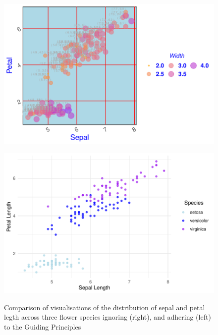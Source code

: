\documentclass{article}\usepackage[]{graphicx}\usepackage[]{xcolor}
\newenvironment{knitrout}{}{} %
\begin{document}
\begin{figure}[htbp]
  \centering
  \begin{minipage}[b]{0.45\linewidth}
\begin{knitrout}\scriptsize
{}\color{fgcolor}

{\centering \includegraphics[width=\linewidth]{figure/beamer-messygraph-1} 

}


\end{knitrout}
    \label{fig:messygraph}
  \end{minipage}
  \hfill
  \begin{minipage}[b]{0.45\linewidth}
\begin{knitrout}\scriptsize
{}\color{fgcolor}

{\centering \includegraphics[width=\linewidth]{figure/beamer-cleargraph1-1} 

}


\end{knitrout}
    \label{fig:cleargraph1}
  \end{minipage}
\caption{Comparison of visualisations of the distribution of sepal and petal legth across three flower species ignoring (right), and adhering (left) to the Guiding Principles}
\end{figure}
\end{document}
